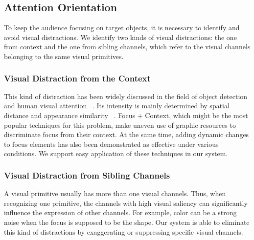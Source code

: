 
\subsection{Attention Orientation}
To keep the audience focusing on target objects, it is necessary to identify and avoid visual distractions. 
 We identify two kinds of visual distractions: the one from context and the one from sibling channels, which refer to the visual channels belonging to the same visual primitives. 

\subsubsection{Visual Distraction from the Context}
This kind of distraction has been widely discussed in the field of object detection and human visual attention ~\cite{nothdurft_salience_2000, standage_modelling_2005}. Its intensity is mainly  determined by spatial distance and appearance similarity ~\cite{wolfe_guided_1994}. 
Focus + Context, which might be the most popular techniques for this problem, make uneven use of graphic resources to discriminate focus from their context. At the same time, adding dynamic changes to focus elements has also been demonstrated as effective under various conditions\cite{waldner_attractive_2014}. We support easy application of these techniques in our system. 

\subsubsection{Visual Distraction from Sibling Channels}
A visual primitive usually has more than one visual channels. Thus, when recognizing one primitive, the channels with high visual saliency can significantly influence the expression of other channels. For example, color can be a strong noise when the focus is supposed to be the shape.
Our system is able to eliminate this kind of distractions by exaggerating or suppressing specific visual channels.


